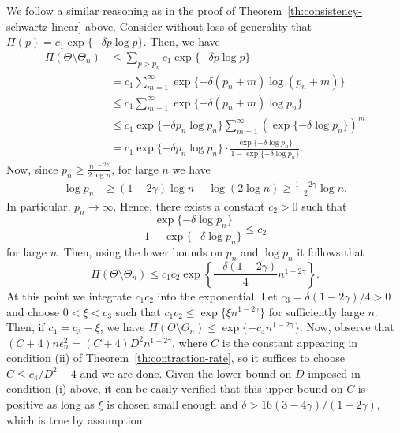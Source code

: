 \noindent We follow a similar reasoning as in the proof of Theorem~\ref{th:consistency-schwartz-linear} above. Consider without loss of generality that \(\Pi(p)=c_1\exp\{-\delta p \log p\}\). Then, we have
\begin{align*}
  \Pi(\Theta \setminus \Theta_n) & \leq \sum_{p>p_n} c_1\exp\{-\delta p \log p\}                                                        \\
                                 & = c_1\sum_{m=1}^\infty \exp\{-\delta (p_n+m) \log(p_n+m)\}                                           \\
                                 & \leq c_1\sum_{m=1}^\infty  \exp\{-\delta(p_n+m)\log p_n\}                                            \\
                                 & \leq c_1\exp\{-\delta p_n \log p_n\} \sum_{m=1}^\infty \left(\exp\{-\delta \log p_n\}\right)^m       \\
                                 & = c_1\exp\{-\delta p_n \log p_n\} \cdot \frac{\exp\{-\delta \log p_n\}}{1-\exp\{-\delta \log p_n\}}.
\end{align*}
Now, since \(p_n\geq \frac{n^{1-2\gamma}}{2\log n}\), for large \(n\) we have
\begin{align*}
  \log p_n & \geq (1-2\gamma)\log n - \log (2\log n) \geq \frac{1-2\gamma}{2}\log n.
\end{align*}
In particular, \(p_n\to\infty\). Hence, there exists a constant \(c_2>0\) such that
\[
  \frac{\exp\{-\delta \log p_n\}}{1-\exp\{-\delta \log p_n\}}\leq c_2
\]
for large \(n\). Then, using the lower bounds on \(p_n\) and \(\log p_n\) it follows that
\[
  \Pi(\Theta \setminus \Theta_n) \leq c_1c_2 \exp\left\{\frac{-\delta (1-2\gamma)}{4}n^{1-2\gamma}\right\}.
\]
At this point we integrate \(c_1c_2\) into the exponential. Let \(c_3=\delta(1-2\gamma)/4>0\) and choose \(0<\xi<c_3\) such that \(c_1c_2\leq \exp\{\xi n^{1-2\gamma}\}\) for sufficiently large \(n\). Then, if \(c_4=c_3-\xi\), we have \(\Pi(\Theta \setminus \Theta_n) \leq \exp\{-c_4n^{1-2\gamma}\}\). Now, observe that \((C+4)n\epsilon_n^2=(C+4)D^2n^{1-2\gamma}\), where \(C\) is the constant appearing in condition (ii) of Theorem~\ref{th:contraction-rate}, so it suffices to choose \(C\leq c_4/D^2 -4\) and we are done. Given the lower bound on \(D\) imposed in condition (i) above, it can be easily verified that this upper bound on \(C\) is positive as long as \(\xi\) is chosen small enough and \(\delta > 16(3-4\gamma)/(1-2\gamma)\), which is true by assumption.\\

